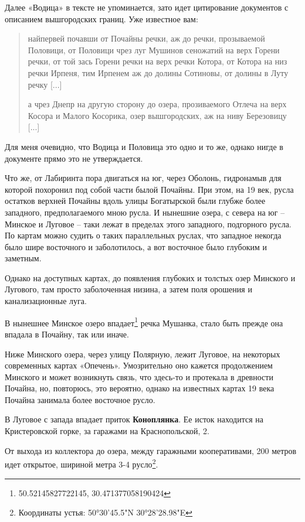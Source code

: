 Далее «Водица» в тексте не упоминается, зато идет цитирование документов с описанием вышгородских границ. Уже известное вам:

\begin{quotation}
найпервей почавши от Почайны речки, аж до речки, прозываемой Половици, от Половици чрез луг Мушинов сеножатий на верх Горени речки, от той зась Горени речки на верх речки Котора, от Котора на низ речки Ирпеня, тим Ирпенем аж до долины Сотиновы, от долины в Луту речку [...]

а чрез Днепр на другую сторону до озера, прозиваемого Отлеча на верх Косора и Малого Косорика, озер вышгородских, аж на ниву Березовицу [...]
\end{quotation}

Для меня очевидно, что Водица и Половица это одно и то же, однако нигде в документе прямо это не утверждается.

Что же, от Лабиринта пора двигаться на юг, через Оболонь, гидронамыв для которой похоронил под собой части былой Почайны. При этом, на 19 век, русла остатков верхней Почайны вдоль улицы Богатырской были глубже более западного, предполагаемого мною русла. И нынешние озера, с севера на юг – Минское и Луговое – таки лежат в пределах этого западного, подгорного русла. По картам можно судить о таких параллельных руслах, что западное некогда было шире восточного и заболотилось, а вот восточное было глубоким и заметным.  

Однако на доступных картах, до появления глубоких и толстых озер Минского и Лугового, там просто заболоченная низина, а затем поля орошения и канализационные луга.

В нынешнее Минское озеро впадает\footnote{50.52145827722145, 30.471377058190424} речка Мушанка, стало быть прежде она впадала в Почайну, так или иначе.

Ниже Минского озера, через улицу Полярную, лежит Луговое, на некоторых современных картах «Опечень». Умозрительно оно кажется продолжением Минского и может возникнуть связь, что здесь-то и протекала в древности Почайна, но, повторюсь, это вероятно, однако на известных картах 19 века Почайна занимала более восточное русло.

В Луговое с запада впадает приток \textbf{Коноплянка}. Ее исток находится на Кристеровской горке, за гаражами на Краснопольской, 2. 

От выхода из коллектора до озера, между гаражными кооперативами, 200 метров идет открытое, шириной метра 3-4 русло\footnote{Координаты устья: 50°30'45.5"N 30°28'28.98"E}. 

